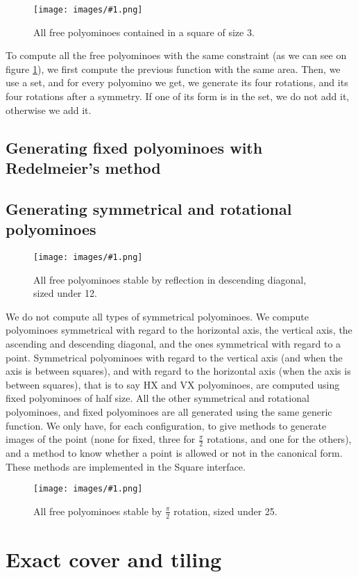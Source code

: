 \documentclass[12pt]{article}
\newcommand{\illustration}[2]{
	\begin{figure}[]
	\begin{center}
	\texttt{[image: images/\#1.png]}
	\caption{#2}
	\label{fig:#1}
	\end{center}
	\end{figure}
}
\begin{document}
\illustration{free_3_3}{All free polyominoes contained in a square of size 3.}

To compute all the free polyominoes with the same constraint (as we can see on figure \ref{fig:free_3_3}), we first compute the previous function with the same area.
Then, we use a set, and for every polyomino we get, we generate its four rotations, and its four rotations after a symmetry.
If one of its form is in the set, we do not add it, otherwise we add it.

\subsection{Generating fixed polyominoes with Redelmeier’s method}



\subsection{Generating symmetrical and rotational polyominoes}

\illustration{diagonal}{All free polyominoes stable by reflection in descending diagonal, sized under 12.}

We do not compute all types of symmetrical polyominoes.
We compute polyominoes symmetrical with regard to the horizontal axis, the vertical axis, the ascending and descending diagonal, and the ones symmetrical with regard to a point.
Symmetrical polyominoes with regard to the vertical axis (and when the axis is between squares), and with regard to the horizontal axis (when the axis is between squares), that is to say HX and VX polyominoes, are computed using fixed polyominoes of half size.
All the other symmetrical and rotational polyominoes, and fixed polyominoes are all generated using the same generic function.
We only have, for each configuration, to give methods to generate images of the point (none for fixed, three for $\frac{\pi}{2}$ rotations, and one for the others), and a method to know whether a point is allowed or not in the canonical form.
These methods are implemented in the Square interface.

\illustration{rotational_25}{All free polyominoes stable by $\frac{\pi}{2}$ rotation, sized under 25.}



\section{Exact cover and tiling}
\end{document}

